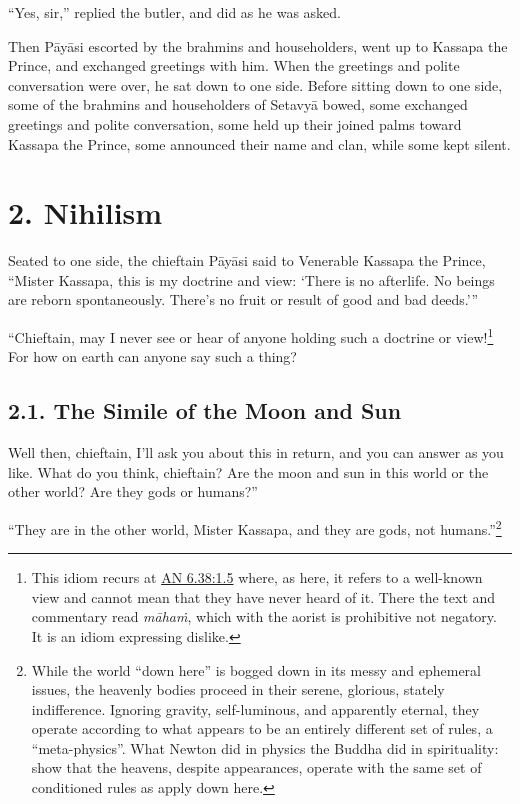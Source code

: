\documentclass[12pt,openany]{book}%
\begin{document}
“Yes, sir,” replied the butler, and did as he was asked. 

Then \textsanskrit{Pāyāsi} escorted by the brahmins and householders, went up to Kassapa the Prince, and exchanged greetings with him. When the greetings and polite conversation were over, he sat down to one side. Before sitting down to one side, some of the brahmins and householders of \textsanskrit{Setavyā} bowed, some exchanged greetings and polite conversation, some held up their joined palms toward Kassapa the Prince, some announced their name and clan, while some kept silent. 

\section*{2. Nihilism }

Seated to one side, the chieftain \textsanskrit{Pāyāsi} said to Venerable Kassapa the Prince, “Mister Kassapa, this is my doctrine and view: ‘There is no afterlife. No beings are reborn spontaneously. There’s no fruit or result of good and bad deeds.’” 

“Chieftain, may I never see or hear of anyone holding such a doctrine or view!\footnote{This idiom recurs at \href{https://suttacentral.net/an6.38/en/sujato\#1.5}{AN 6.38:1.5} where, as here, it refers to a well-known view and cannot mean that they have never heard of it. There the text and commentary read \textit{\textsanskrit{māhaṁ}}, which with the aorist is prohibitive not negatory. It is an idiom expressing dislike. } For how on earth can anyone say such a thing? 

\subsection*{2.1. The Simile of the Moon and Sun }

Well then, chieftain, I’ll ask you about this in return, and you can answer as you like. What do you think, chieftain? Are the moon and sun in this world or the other world? Are they gods or humans?” 

“They are in the other world, Mister Kassapa, and they are gods, not humans.”\footnote{While the world “down here” is bogged down in its messy and ephemeral issues, the heavenly bodies proceed in their serene, glorious, stately indifference. Ignoring gravity, self-luminous, and apparently eternal, they operate according to what appears to be an entirely different set of rules, a “meta-physics”. What Newton did in physics the Buddha did in spirituality: show that the heavens, despite appearances, operate with the same set of conditioned rules as apply down here. } 
\end{document}
